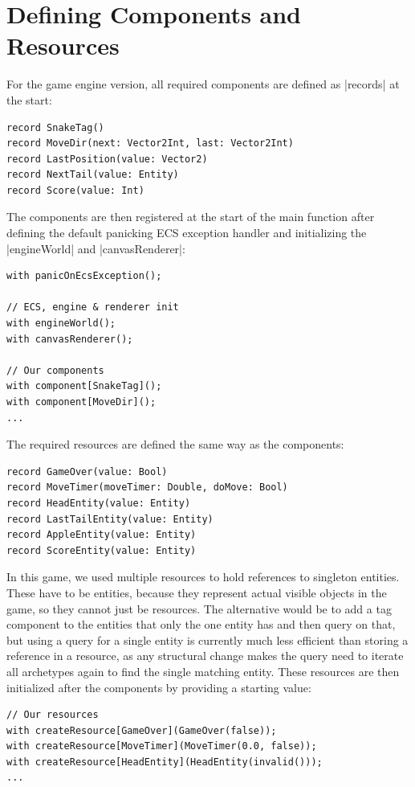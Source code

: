 \section{Defining Components and Resources}

For the game engine version, all required components are defined as |records| at the start:

\begin{lstlisting}
record SnakeTag()
record MoveDir(next: Vector2Int, last: Vector2Int)
record LastPosition(value: Vector2)
record NextTail(value: Entity)
record Score(value: Int)
\end{lstlisting}

The components are then registered at the start of the main function after defining the default panicking ECS exception handler and initializing the |engineWorld| and |canvasRenderer|:

\begin{lstlisting}
with panicOnEcsException();

// ECS, engine & renderer init
with engineWorld();
with canvasRenderer();

// Our components
with component[SnakeTag]();
with component[MoveDir]();
...
\end{lstlisting}

The required resources are defined the same way as the components:

\begin{lstlisting}
record GameOver(value: Bool)
record MoveTimer(moveTimer: Double, doMove: Bool)
record HeadEntity(value: Entity)
record LastTailEntity(value: Entity)
record AppleEntity(value: Entity)
record ScoreEntity(value: Entity)
\end{lstlisting}

In this game, we used multiple resources to hold references to singleton entities. These have to be entities, because they represent actual visible objects in the game, so they cannot just be resources. The alternative would be to add a tag component to the entities that only the one entity has and then query on that, but using a query for a single entity is currently much less efficient than storing a reference in a resource, as any structural change makes the query need to iterate all archetypes again to find the single matching entity. These resources are then initialized after the components by providing a starting value:

\begin{lstlisting}
// Our resources
with createResource[GameOver](GameOver(false));
with createResource[MoveTimer](MoveTimer(0.0, false));
with createResource[HeadEntity](HeadEntity(invalid()));
...
\end{lstlisting}

